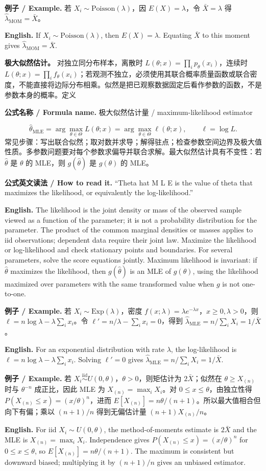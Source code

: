 \documentclass[UTF8,11pt,a4paper]{ctexart}
\newcommand{\EN}[1]{\par\noindent\textbf{English.} #1\par}
\newcommand{\READ}[1]{\par\noindent\textbf{公式英文读法 / How to read it.} #1\par}
\newcommand{\FORMULA}[2]{\par\noindent\textbf{公式名称 / Formula name.} #1 / #2\par}
\newcommand{\EX}[2]{\par\noindent\textbf{例子 / Example.} #1\par\EN{#2}}
\begin{document}
\EX{若 $X_i\sim\mathrm{Poisson}(\lambda)$，因 $E(X)=\lambda$，令 $\bar X=\lambda$ 得 $\hat\lambda_{\mathrm{MOM}}=\bar X$。}{If $X_i\sim\mathrm{Poisson}(\lambda)$, then $E(X)=\lambda$. Equating $\bar X$ to this moment gives $\hat\lambda_{\mathrm{MOM}}=\bar X$.}

\noindent\textbf{极大似然估计。} 对独立同分布样本，离散时 $L(\theta;x)=\prod_i p_\theta(x_i)$，连续时 $L(\theta;x)=\prod_i f_\theta(x_i)$；若观测不独立，必须使用其联合概率质量函数或联合密度，不能直接将边际分布相乘。似然是把已观察数据固定后看作参数的函数，不是参数本身的概率。定义
\FORMULA{极大似然估计量}{maximum-likelihood estimator}
\[
\hat\theta_{\mathrm{MLE}}=\arg\max_{\theta\in\Theta}L(\theta;x)
=\arg\max_{\theta\in\Theta}\ell(\theta;x),\qquad \ell=\log L.
\]
常见步骤：写出联合似然；取对数并求导；解得驻点；检查参数空间边界及极大值性质。多参数问题要对每个参数求偏导并联合求解。最大似然估计具有不变性：若 $\hat\theta$ 是 $\theta$ 的 MLE，则 $g(\hat\theta)$ 是 $g(\theta)$ 的 MLE。
\READ{“Theta hat M L E is the value of theta that maximizes the likelihood, or equivalently the log-likelihood.”}
\EN{The likelihood is the joint density or mass of the observed sample viewed as a function of the parameter; it is not a probability distribution for the parameter. The product of the common marginal densities or masses applies to iid observations; dependent data require their joint law. Maximize the likelihood or log-likelihood and check stationary points and boundaries. For several parameters, solve the score equations jointly. Maximum likelihood is invariant: if $\hat\theta$ maximizes the likelihood, then $g(\hat\theta)$ is an MLE of $g(\theta)$, using the likelihood maximized over parameters with the same transformed value when $g$ is not one-to-one.}

\EX{若 $X_i\sim\mathrm{Exp}(\lambda)$，密度 $f(x;\lambda)=\lambda e^{-\lambda x}$，$x\ge0,\lambda>0$，则 $\ell=n\log\lambda-\lambda\sum_i x_i$。令 $\ell'=n/\lambda-\sum_i x_i=0$，得到 $\hat\lambda_{\mathrm{MLE}}=n/\sum_iX_i=1/\bar X$。}{For an exponential distribution with rate $\lambda$, the log-likelihood is $\ell=n\log\lambda-\lambda\sum_i x_i$. Solving $\ell'=0$ gives $\hat\lambda_{\mathrm{MLE}}=n/\sum_iX_i=1/\bar X$.}

\EX{若 $X_i\overset{\mathrm{iid}}\sim U(0,\theta)$，$\theta>0$，则矩估计为 $2\bar X$；似然在 $\theta\ge X_{(n)}$ 时与 $\theta^{-n}$ 成正比，因此 MLE 为 $X_{(n)}=\max_iX_i$。对 $0\le x\le\theta$，由独立性得 $P(X_{(n)}\le x)=(x/\theta)^n$，进而 $E[X_{(n)}]=n\theta/(n+1)$。所以最大值相合但向下有偏；乘以 $(n+1)/n$ 得到无偏估计量 $(n+1)X_{(n)}/n$。}{For iid $X_i\sim U(0,\theta)$, the method-of-moments estimate is $2\bar X$ and the MLE is $X_{(n)}=\max_iX_i$. Independence gives $P(X_{(n)}\le x)=(x/\theta)^n$ for $0\le x\le\theta$, so $E[X_{(n)}]=n\theta/(n+1)$. The maximum is consistent but downward biased; multiplying it by $(n+1)/n$ gives an unbiased estimator.}
\end{document}
